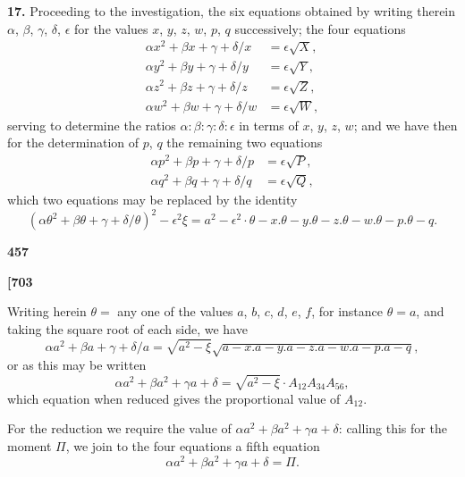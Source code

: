 \documentclass[11pt,a4paper]{book}
\begin{document}
\noindent\textbf{17.}\quad
Proceeding to the investigation, the six equations obtained by writing therein $\alpha$, $\beta$, $\gamma$, $\delta$, $\epsilon$ for the values $x$, $y$, $z$, $w$, $p$, $q$ successively; the four equations
\begin{align*}
\alpha x^2 + \beta x + \gamma + \delta/x &= \epsilon\sqrt{X}, \\
\alpha y^2 + \beta y + \gamma + \delta/y &= \epsilon\sqrt{Y}, \\
\alpha z^2 + \beta z + \gamma + \delta/z &= \epsilon\sqrt{Z}, \\
\alpha w^2 + \beta w + \gamma + \delta/w &= \epsilon\sqrt{W},
\end{align*}
serving to determine the ratios $\alpha : \beta : \gamma : \delta : \epsilon$ in terms of $x$, $y$, $z$, $w$; and we have then for the determination of $p$, $q$ the remaining two equations
\begin{align*}
\alpha p^2 + \beta p + \gamma + \delta/p &= \epsilon\sqrt{P}, \\
\alpha q^2 + \beta q + \gamma + \delta/q &= \epsilon\sqrt{Q},
\end{align*}
which two equations may be replaced by the identity
\[
(\alpha\theta^2 + \beta\theta + \gamma + \delta/\theta)^2 - \epsilon^2\xi = a^2 - \epsilon^2 \cdot \theta - x . \theta - y . \theta - z . \theta - w . \theta - p . \theta - q.
\]

\vspace{1em}

\begin{center}
\textbf{457}
\end{center}

\vspace{0.5em}

\noindent\textbf{[703}

\vspace{0.5em}

Writing herein $\theta = $ any one of the values $a$, $b$, $c$, $d$, $e$, $f$, for instance $\theta = a$, and taking the square root of each side, we have
\[
\alpha a^2 + \beta a + \gamma + \delta/a = \sqrt{a^2 - \xi}\sqrt{a - x . a - y . a - z . a - w . a - p . a - q},
\]
or as this may be written
\[
\alpha a^2 + \beta a^2 + \gamma a + \delta = \sqrt{a^2 - \xi} \cdot A_{12} A_{34} A_{56},
\]
which equation when reduced gives the proportional value of $A_{12}$.

For the reduction we require the value of $\alpha a^2 + \beta a^2 + \gamma a + \delta$: calling this for the moment $\Pi$, we join to the four equations a fifth equation
\[
\alpha a^2 + \beta a^2 + \gamma a + \delta = \Pi.
\]
\end{document}

